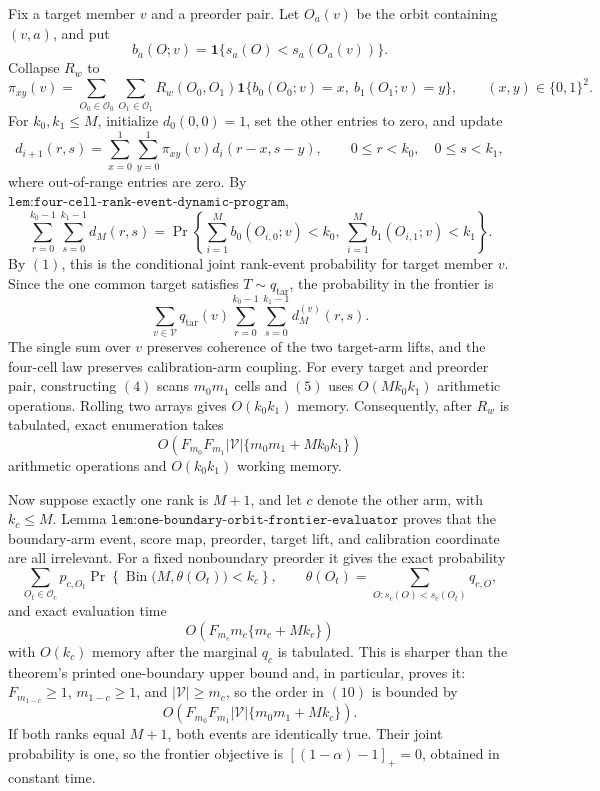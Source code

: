 Fix a target member \(v\) and a preorder pair. Let \(O_a(v)\) be the orbit containing \((v,a)\), and put
\[
b_a(O;v)=\mathbf 1\{s_a(O)<s_a(O_a(v))\}.
\]
Collapse \(R_w\) to
\[
\pi_{xy}(v)=\sum_{O_0\in\mathcal O_0}\sum_{O_1\in\mathcal O_1}R_w(O_0,O_1)
\mathbf 1\{b_0(O_0;v)=x,\ b_1(O_1;v)=y\},
\qquad (x,y)\in\{0,1\}^2.
\tag{4}
\]
For \(k_0,k_1\le M\), initialize \(d_0(0,0)=1\), set the other entries to zero, and update
\[
d_{i+1}(r,s)=\sum_{x=0}^1\sum_{y=0}^1\pi_{xy}(v)d_i(r-x,s-y),
\qquad 0\le r<k_0,\quad 0\le s<k_1,
\tag{5}
\]
where out-of-range entries are zero. By \(\texttt{lem:four-cell-rank-event-dynamic-program}\),
\[
\sum_{r=0}^{k_0-1}\sum_{s=0}^{k_1-1}d_M(r,s)
=\Pr\!\left\{\sum_{i=1}^M b_0(O_{i,0};v)<k_0,\ \sum_{i=1}^M b_1(O_{i,1};v)<k_1\right\}.
\tag{6}
\]
By \((1)\), this is the conditional joint rank-event probability for target member \(v\). Since the one common target satisfies \(T\sim q_{\mathrm{tar}}\), the probability in the frontier is
\[
\sum_{v\in\mathcal V}q_{\mathrm{tar}}(v)
\sum_{r=0}^{k_0-1}\sum_{s=0}^{k_1-1}d_M^{(v)}(r,s).
\tag{7}
\]
The single sum over \(v\) preserves coherence of the two target-arm lifts, and the four-cell law preserves calibration-arm coupling. For every target and preorder pair, constructing \((4)\) scans \(m_0m_1\) cells and \((5)\) uses \(O(Mk_0k_1)\) arithmetic operations. Rolling two arrays gives \(O(k_0k_1)\) memory. Consequently, after \(R_w\) is tabulated, exact enumeration takes
\[
O\!\left(F_{m_0}F_{m_1}|\mathcal V|\{m_0m_1+Mk_0k_1\}\right)
\tag{8}
\]
arithmetic operations and \(O(k_0k_1)\) working memory.

Now suppose exactly one rank is \(M+1\), and let \(c\) denote the other arm, with \(k_c\le M\). Lemma \(\texttt{lem:one-boundary-orbit-frontier-evaluator}\) proves that the boundary-arm event, score map, preorder, target lift, and calibration coordinate are all irrelevant. For a fixed nonboundary preorder it gives the exact probability
\[
\sum_{O_t\in\mathcal O_c}p_{c,O_t}
\Pr\!\left\{\operatorname{Bin}\bigl(M,\theta(O_t)\bigr)<k_c\right\},
\qquad
\theta(O_t)=\sum_{O:s_c(O)<s_c(O_t)}q_{c,O},
\tag{9}
\]
and exact evaluation time
\[
O\!\left(F_{m_c}m_c\{m_c+Mk_c\}\right)
\tag{10}
\]
with \(O(k_c)\) memory after the marginal \(q_c\) is tabulated. This is sharper than the theorem's printed one-boundary upper bound and, in particular, proves it: \(F_{m_{1-c}}\ge1\), \(m_{1-c}\ge1\), and \(|\mathcal V|\ge m_c\), so the order in \((10)\) is bounded by
\[
O\!\left(F_{m_0}F_{m_1}|\mathcal V|\{m_0m_1+Mk_c\}\right).
\]
If both ranks equal \(M+1\), both events are identically true. Their joint probability is one, so the frontier objective is \([(1-\alpha)-1]_+=0\), obtained in constant time.

